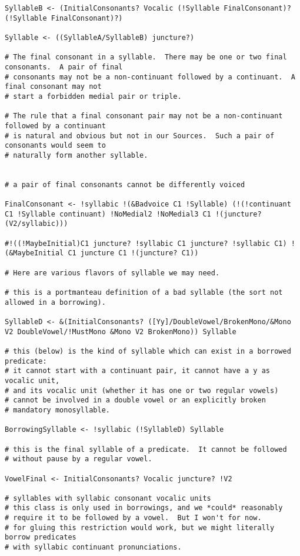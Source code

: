 \documentclass{article}
\begin{document}
\begin{verbatim}
SyllableB <- (InitialConsonants? Vocalic (!Syllable FinalConsonant)? (!Syllable FinalConsonant)?)

Syllable <- ((SyllableA/SyllableB) juncture?)

# The final consonant in a syllable.  There may be one or two final consonants.  A pair of final
# consonants may not be a non-continuant followed by a continuant.  A final consonant may not
# start a forbidden medial pair or triple.

# The rule that a final consonant pair may not be a non-continuant followed by a continuant
# is natural and obvious but not in our Sources.  Such a pair of consonants would seem to 
# naturally form another syllable.


# a pair of final consonants cannot be differently voiced

FinalConsonant <- !syllabic !(&Badvoice C1 !Syllable) (!(!continuant C1 !Syllable continuant) !NoMedial2 !NoMedial3 C1 !(juncture? (V2/syllabic)))

#!((!MaybeInitial)C1 juncture? !syllabic C1 juncture? !syllabic C1) !(&MaybeInitial C1 juncture C1 !(juncture? C1))

# Here are various flavors of syllable we may need.

# this is a portmanteau definition of a bad syllable (the sort not allowed in a borrowing).

SyllableD <- &(InitialConsonants? ([Yy]/DoubleVowel/BrokenMono/&Mono V2 DoubleVowel/!MustMono &Mono V2 BrokenMono)) Syllable

# this (below) is the kind of syllable which can exist in a borrowed predicate:
# it cannot start with a continuant pair, it cannot have a y as vocalic unit,
# and its vocalic unit (whether it has one or two regular vowels) 
# cannot be involved in a double vowel or an explicitly broken 
# mandatory monosyllable.

BorrowingSyllable <- !syllabic (!SyllableD) Syllable

# this is the final syllable of a predicate.  It cannot be followed
# without pause by a regular vowel.

VowelFinal <- InitialConsonants? Vocalic juncture? !V2

# syllables with syllabic consonant vocalic units
# this class is only used in borrowings, and we *could* reasonably
# require it to be followed by a vowel.  But I won't for now.
# for gluing this restriction would work, but we might literally borrow predicates
# with syllabic continuant pronunciations.


\end{verbatim}
\end{document}
